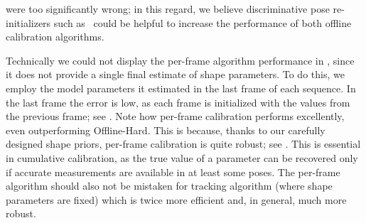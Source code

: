 were too significantly wrong; in this regard, we believe discriminative pose re-initializers such as~\cite{oberweger2015hands} could be helpful to increase the performance of both offline calibration algorithms.

\begin{edit}
Technically we could not display the per-frame algorithm performance in , since it does not provide a single final estimate of shape parameters. To do this, we employ the model parameters it estimated in the last frame of each sequence. In the last frame the error is low, as each frame is initialized with the values from the previous frame; see \VideoReal{}. Note how per-frame calibration performs excellently, even outperforming Offline-Hard. This is because, thanks to our carefully designed shape priors, per-frame calibration is quite robust; see \VideoReal{}. This is essential in cumulative calibration, as the true value of a parameter can be recovered only if accurate measurements are available in at least some poses. The per-frame algorithm should also not be mistaken for tracking algorithm (where shape parameters are fixed) which is twice more efficient and, in general, much more robust.
\end{edit}

